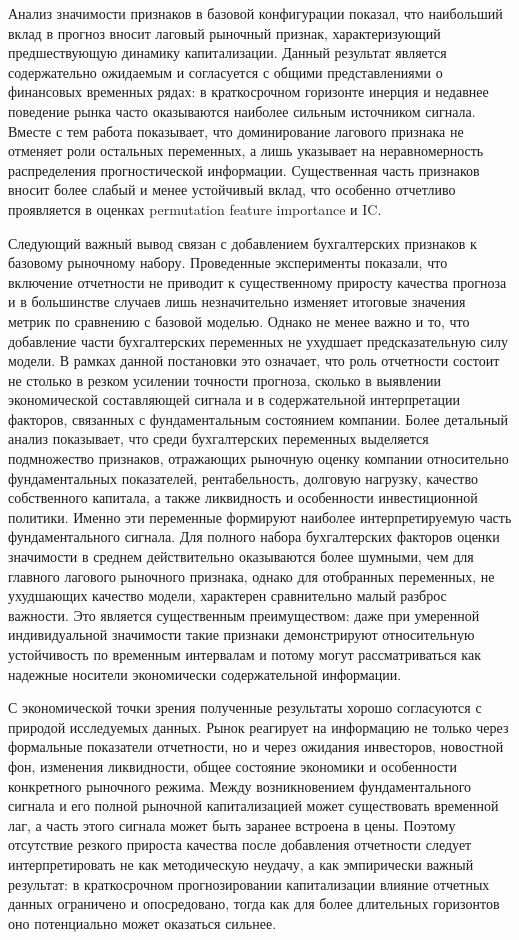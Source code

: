 \documentclass[
]{article}
\begin{document}
Анализ значимости признаков в базовой конфигурации показал, что наибольший вклад в прогноз вносит лаговый рыночный признак, характеризующий предшествующую динамику капитализации. Данный результат является содержательно ожидаемым и согласуется с общими представлениями о финансовых временных рядах: в краткосрочном горизонте инерция и недавнее поведение рынка часто оказываются наиболее сильным источником сигнала. Вместе с тем работа показывает, что доминирование лагового признака не отменяет роли остальных переменных, а лишь указывает на неравномерность распределения прогностической информации. Существенная часть признаков вносит более слабый и менее устойчивый вклад, что особенно отчетливо проявляется в оценках permutation feature importance и IC.

Следующий важный вывод связан с добавлением бухгалтерских признаков к базовому рыночному набору. Проведенные эксперименты показали, что включение отчетности не приводит к существенному приросту качества прогноза и в большинстве случаев лишь незначительно изменяет итоговые значения метрик по сравнению с базовой моделью. Однако не менее важно и то, что добавление части бухгалтерских переменных не ухудшает предсказательную силу модели. В рамках данной постановки это означает, что роль отчетности состоит не столько в резком усилении точности прогноза, сколько в выявлении экономической составляющей сигнала и в содержательной интерпретации факторов, связанных с фундаментальным состоянием компании. Более детальный анализ показывает, что среди бухгалтерских переменных выделяется подмножество признаков, отражающих рыночную оценку компании относительно фундаментальных показателей, рентабельность, долговую нагрузку, качество собственного капитала, а также ликвидность и особенности инвестиционной политики. Именно эти переменные формируют наиболее интерпретируемую часть фундаментального сигнала. Для полного набора бухгалтерских факторов оценки значимости в среднем действительно оказываются более шумными, чем для главного лагового рыночного признака, однако для отобранных переменных, не ухудшающих качество модели, характерен сравнительно малый разброс важности. Это является существенным преимуществом: даже при умеренной индивидуальной значимости такие признаки демонстрируют относительную устойчивость по временным интервалам и потому могут рассматриваться как надежные носители экономически содержательной информации.

С экономической точки зрения полученные результаты хорошо согласуются с природой исследуемых данных. Рынок реагирует на информацию не только через формальные показатели отчетности, но и через ожидания инвесторов, новостной фон, изменения ликвидности, общее состояние экономики и особенности конкретного рыночного режима. Между возникновением фундаментального сигнала и его полной рыночной капитализацией может существовать временной лаг, а часть этого сигнала может быть заранее встроена в цены. Поэтому отсутствие резкого прироста качества после добавления отчетности следует интерпретировать не как методическую неудачу, а как эмпирически важный результат: в краткосрочном прогнозировании капитализации влияние отчетных данных ограничено и опосредовано, тогда как для более длительных горизонтов оно потенциально может оказаться сильнее.
\end{document}
